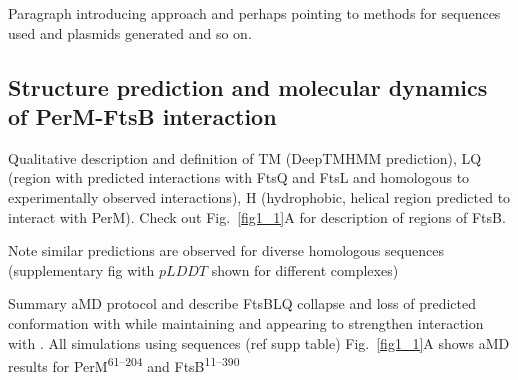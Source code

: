 \documentclass[pdflatex,sn-basic]{sn-jnl}%
\begin{document}
\loremipsum{}

Paragraph introducing approach and perhaps pointing to methods for sequences used and plasmids generated and so on.

\subsection{Structure prediction and molecular dynamics of PerM-FtsB interaction}

\loremipsum{}

Qualitative description and definition of TM (DeepTMHMM prediction), LQ (region with predicted interactions with FtsQ and FtsL and homologous to experimentally observed interactions), H (hydrophobic, helical region predicted to interact with PerM).
Check out Fig.~\ref{fig1_1}A for description of regions of FtsB.

Note similar predictions are observed for diverse homologous sequences (supplementary fig with $pLDDT$ shown for different complexes)

Summary aMD protocol and describe FtsBLQ collapse and loss of predicted conformation with \ftsbTM{} while maintaining and appearing to strengthen interaction with \ftsbH{}.
All simulations using \mtb{} sequences (ref supp table)
Fig.~\ref{fig1_1}A shows aMD results for PerM\textsuperscript{61--204} and FtsB\textsuperscript{11--390}
\end{document}
